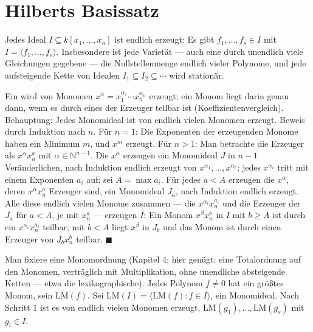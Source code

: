 \section{Hilberts Basissatz}

\begin{merksatz}
Jedes Ideal $I\subseteq k[x_1, \ldots, x_n]$ ist endlich erzeugt: Es gibt $f_1, \ldots, f_s\in I$ mit $I = \langle f_1, \ldots, f_s\rangle$. Insbesondere ist jede Varietät --- auch eine durch unendlich viele Gleichungen gegebene --- die Nullstellenmenge endlich vieler Polynome, und jede aufsteigende Kette von Idealen $I_1\subseteq I_2\subseteq\cdots$ wird stationär.

Ein  wird von Monomen $x^{\alpha} = x_1^{\alpha_1}\cdots x_n^{\alpha_n}$ erzeugt; ein Monom liegt darin genau dann, wenn es durch eines der Erzeuger teilbar ist (Koeffizientenvergleich). Behauptung: Jedes Monomideal ist von endlich vielen Monomen erzeugt. Beweis durch Induktion nach $n$. Für $n = 1$: Die Exponenten der erzeugenden Monome haben ein Minimum $m$, und $x^{m}$ erzeugt. Für $n > 1$: Man betrachte die Erzeuger als $x^{\alpha}x_n^{a}$ mit $\alpha\in\mathbb N^{n-1}$. Die $x^{\alpha}$ erzeugen ein Monomideal $J$ in $n - 1$ Veränderlichen, nach Induktion endlich erzeugt von $x^{\alpha_1}, \ldots, x^{\alpha_r}$; jedes $x^{\alpha_i}$ tritt mit einem Exponenten $a_i$ auf; sei $A = \max a_i$. Für jedes $a < A$ erzeugen die $x^{\alpha}$, deren $x^{\alpha}x_n^{a}$ Erzeuger sind, ein Monomideal $J_a$, nach Induktion endlich erzeugt. Alle diese endlich vielen Monome zusammen --- die $x^{\alpha_i}x_n^{a_i}$ und die Erzeuger der $J_a$ für $a < A$, je mit $x_n^{a}$ --- erzeugen $I$: Ein Monom $x^{\beta}x_n^{b}$ in $I$ mit $b\ge A$ ist durch ein $x^{\alpha_i}x_n^{a_i}$ teilbar; mit $b < A$ liegt $x^{\beta}$ in $J_b$ und das Monom ist durch einen Erzeuger von $J_bx_n^{b}$ teilbar. $\blacksquare$

Man fixiere eine Monomordnung (Kapitel 4; hier genügt: eine Totalordnung auf den Monomen, verträglich mit Multiplikation, ohne unendliche absteigende Ketten --- etwa die lexikographische). Jedes Polynom $f\ne0$ hat ein größtes Monom, sein  $\mathrm{LM}(f)$. Sei $\mathrm{LM}(I) = \langle\mathrm{LM}(f) : f\in I\rangle$, ein Monomideal. Nach Schritt 1 ist es von endlich vielen Monomen erzeugt, $\mathrm{LM}(g_1), \ldots, \mathrm{LM}(g_s)$ mit $g_i\in I$.


\end{merksatz}
